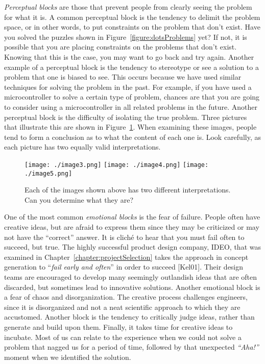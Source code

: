 \emph{Perceptual blocks} are those that prevent people from clearly
seeing the problem for what it is. A common perceptual block is the
tendency to delimit the problem space, or in other words, to put
constraints on the problem that don't exist. Have you solved the puzzles
shown in Figure~\ref{figure:dotsProblems} yet? If not, it is possible that you are placing
constraints on the problems that don't exist. Knowing that this is the
case, you may want to go back and try again. Another example of a
perceptual block is the tendency to stereotype or see a solution to a
problem that one is biased to see. This occurs because we have used
similar techniques for solving the problem in the past. For example, if
you have used a microcontroller to solve a certain type of problem,
chances are that you are going to consider using a microcontroller in
all related problems in the future. Another perceptual block is the
difficulty of isolating the true problem. Three pictures that illustrate
this are shown in Figure~\ref{figure:differentInterpertations}. When examining these images, people tend
to form a conclusion as to what the content of each one is. Look
carefully, as each picture has two equally valid interpretations.

\begin{figure}
\hspace{0.5cm}
\texttt{[image: ./image3.png]}
\hspace{0.1cm}
\texttt{[image: ./image4.png]}
\hspace{0.1cm}
\texttt{[image: ./image5.png]}
\caption{Each of the images shown above has two different
interpretations. Can you determine what they are?}
\label{figure:differentInterpertations}
\end{figure}


One of the most common \emph{emotional blocks} is the fear of failure.
People often have creative ideas, but are afraid to express them since
they may be criticized or may not have the ``correct'' answer. It is
cliché to hear that you must fail often to succeed, but true. The highly
successful product design company, IDEO, that was examined in 
Chapter~\ref{chapter:projectSelection}
takes the approach in con­cept generation to ``\emph{fail early and
often}'' in order to succeed {[}Kel01{]}. Their design teams are
en­couraged to develop many seemingly outlandish ideas that are often
discarded, but some­times lead to innovative solutions. Another emotional
block is a fear of chaos and disorgani­zation. The creative process
challenges engineers, since it is disorganized and not a neat scien­tific
approach to which they are accustomed. Another block is the tendency to
critically judge ideas, rather than generate and build upon them.
Finally, it takes time for creative ideas to incubate. Most of us can
relate to the experience when we could not solve a problem that nagged
us for a period of time, followed by that unexpected \emph{``Aha!''}
moment when we identi­fied the solution.

